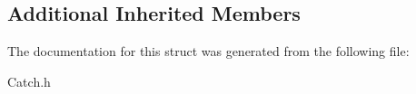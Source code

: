 \subsection*{Additional Inherited Members}


The documentation for this struct was generated from the following file\-:\begin{DoxyCompactItemize}
\item 
Catch.\-h\end{DoxyCompactItemize}
